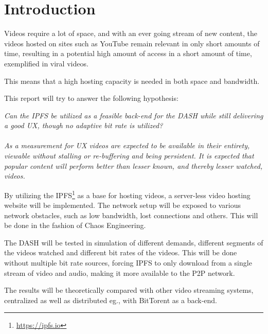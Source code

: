 \chapter{Introduction}
\label{cha:introduction}
Videos require a lot of space, and with an ever going stream of new content, the videos hosted on sites such as YouTube remain relevant in only short amounts of time, resulting in a potential high amount of access in a short amount of time, exemplified in viral videos.

This means that a high hosting capacity is needed in both space and bandwidth.

This report will try to answer the following hypothesis:

\begin{displayquote}
    \textit{
        Can the \acl{IPFS} be utilized as a feasible back-end for the \acl{DASH} while still delivering a good \ac{UX}, though no adaptive bit rate is utilized? \\ \\
        As a measurement for \acs{UX} videos are expected to be available in their entirety, viewable without stalling or re-buffering and being persistent. It is expected that popular content will perform better than lesser known, and thereby lesser watched, videos.
    }
\end{displayquote}

By utilizing the \ac{IPFS}\footnote{\url{https://ipfs.io}} as a base for hosting videos, a server-less video hosting website will be implemented. The network setup will be exposed to various network obstacles, such as low bandwidth, lost connections and others. This will be done in the fashion of Chaos Engineering.

The \ac{DASH} will be tested in simulation of different demands, different segments of the videos watched and different bit rates of the videos. This will be done without multiple bit rate sources, forcing IPFS to only download from a single stream of video and audio, making it more available to the \ac{P2P} network.

The results will be theoretically compared with other video streaming systems, centralized as well as distributed eg., with BitTorent as a back-end.

